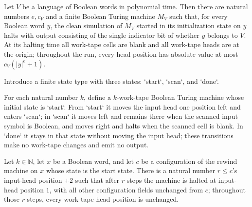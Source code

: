 \begin{theorem}
\label{Complexity.b2b_clean_verifier}
\leanok
{}
Let $V$ be a language of Boolean words in polynomial time. Then there are natural
numbers $e,c_V$ and a finite Boolean Turing machine $M_V$ such that, for every Boolean
word $y$, the clean simulation of $M_V$ started in its initialization state on $y$ halts
with output consisting of the single indicator bit of whether $y$ belongs to $V$. At its
halting time all work-tape cells are blank and all work-tape heads are at the origin;
throughout the run, every head position has absolute value at most $c_V(|y|^e+1)$.
\end{theorem}

\begin{definition}
\label{Complexity.B2bRewindState}
\leanok
Introduce a finite state type with three states: `start`, `scan`, and `done`.
\end{definition}

\begin{definition}
\label{Complexity.b2b_rewindTM}
\leanok
{}
For each natural number $k$, define a $k$-work-tape Boolean Turing machine whose initial
state is `start`. From `start` it moves the input head one position left and enters
`scan`; in `scan` it moves left and remains there when the scanned input symbol is
Boolean, and moves right and halts when the scanned cell is blank. In `done` it stays in
that state without moving the input head; these transitions make no work-tape changes
and emit no output.
\end{definition}

\begin{theorem}
\label{Complexity.b2b_rewind_run}
\leanok
{}
Let $k\in\mathbb{N}$, let $x$ be a Boolean word, and let $c$ be a configuration of the
rewind machine on $x$ whose state is the start state. There is a natural number $r\le
c$'s input-head position $+2$ such that after $r$ steps the machine is halted at
input-head position $1$, with all other configuration fields unchanged from $c$;
throughout those $r$ steps, every work-tape head position is unchanged.
\end{theorem}

